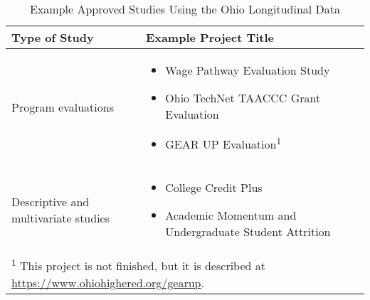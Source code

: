 \begin{table}

\caption{\label{tab:oldatable2}Example Approved Studies Using the Ohio Longitudinal Data}
\centering
\begin{tabular}[t]{lp{}}
    \toprule
    Type of Study & Example Project Title\\
    \midrule
    Program evaluations &    
    \begin{itemize}
        \tightlist
        \item Wage Pathway Evaluation Study \citep{hawley2019}
        \item Ohio TechNet TAACCC Grant Evaluation \citep{newgrowthgrouptheohioeducationresearchcenter2018}
        \item GEAR UP Evaluation\textsuperscript{1}
    \end{itemize}\\
    Descriptive and multivariate studies & 
    \begin{itemize}
        \tightlist 
        \item College Credit Plus \citep{harlow2018}
        \item Academic Momentum and Undergraduate Student Attrition \citep{kondratjeva2017}
    \end{itemize}\\
    \bottomrule
    \multicolumn{2}{l}{\rule{0pt}{1em}\textsuperscript{1} This project is not finished, but it is described at \url{https://www.ohiohighered.org/gearup}.}\\
\end{tabular}
\end{table}

